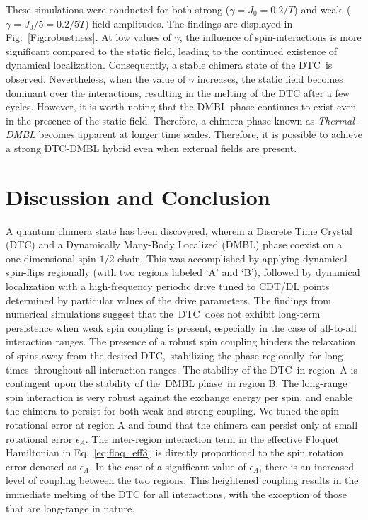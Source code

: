 \documentclass[%
nofootinbib,
reprint,
superscriptaddress,
amsmath,amssymb,showkeys,
aps,
prb,
]{revtex4-2}
\begin{document}
	These simulations were conducted for both strong ($\gamma= J_0=0.2/T$) and weak ($ \gamma=J_0/5 = 0.2/5T$) field amplitudes. The findings are displayed in Fig.~\ref{Fig:robustness}. At low values of $\gamma$, the influence of spin-interactions is more significant compared to the static field, leading to the continued existence of dynamical localization. Consequently, a stable chimera state of the DTC is observed. Nevertheless, when the value of $\gamma$ increases, the static field becomes dominant over the interactions, resulting in the melting of the DTC after a few cycles. However, it is worth noting that the DMBL phase continues to exist even in the presence of the static field. Therefore, a chimera phase known as \textit{Thermal-DMBL} becomes apparent at longer time scales. Therefore, it is possible to achieve a strong DTC-DMBL hybrid even when external fields are present.
	
	\section{\label{sec:level7} Discussion and Conclusion}
	A quantum chimera state has been discovered, wherein a Discrete Time Crystal (DTC) and a Dynamically Many-Body Localized (DMBL) phase coexist on a one-dimensional spin-$1/2$ chain. This was accomplished  by applying dynamical spin-flips regionally (with two regions labeled `A' and `B'), followed by dynamical localization with a high-frequency periodic drive tuned to CDT/DL points determined by particular values of the drive parameters. The findings from numerical simulations suggest that the DTC does not exhibit long-term persistence when weak spin coupling is present, especially in the case of all-to-all interaction ranges. The presence of a robust spin coupling hinders the relaxation of spins away from the desired DTC, stabilizing the phase regionally for long times throughout all interaction ranges. The stability of the DTC in region A is contingent upon the stability of the DMBL phase in region B. The long-range spin interaction is very robust against the exchange energy per spin, and enable the chimera to persist for both weak and strong coupling. We tuned the spin rotational error at region A and found that the chimera can persist only at small rotational error $\epsilon_A$. The inter-region interaction term in the effective Floquet Hamiltonian in Eq.~\ref{eq:floq_eff3} is directly proportional to the spin rotation error denoted as $\epsilon_A$. In the case of a significant value of $\epsilon_A$, there is an increased level of coupling between the two regions. This heightened coupling results in the immediate melting of the DTC for all interactions, with the exception of those that are long-range in nature.
	
\end{document}
